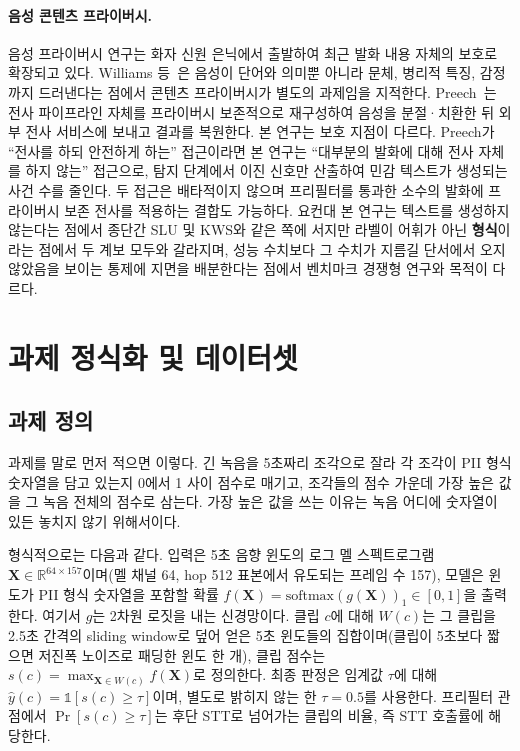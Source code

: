 \documentclass[10pt,twocolumn]{article}
\renewcommand{\emph}[1]{\textbf{#1}}
\begin{document}
\paragraph{음성 콘텐츠 프라이버시.}
음성 프라이버시 연구는 화자 신원 은닉에서 출발하여 최근 발화 내용 자체의 보호로 확장되고
있다. Williams 등~\cite{williams2022content}은 음성이 단어와 의미뿐 아니라 문체, 병리적 특징,
감정까지 드러낸다는 점에서 콘텐츠 프라이버시가 별도의 과제임을 지적한다.
Preech~\cite{ahmed2020preech}는 전사 파이프라인 자체를 프라이버시 보존적으로 재구성하여
음성을 분절·치환한 뒤 외부 전사 서비스에 보내고 결과를 복원한다. 본 연구는 보호 지점이
다르다. Preech가 ``전사를 하되 안전하게 하는'' 접근이라면 본 연구는 ``대부분의 발화에 대해
전사 자체를 하지 않는'' 접근으로, 탐지 단계에서 이진 신호만 산출하여 민감 텍스트가 생성되는
사건 수를 줄인다. 두 접근은 배타적이지 않으며 프리필터를 통과한 소수의 발화에 프라이버시
보존 전사를 적용하는 결합도 가능하다. 요컨대 본 연구는 텍스트를 생성하지 않는다는 점에서
종단간 SLU 및 KWS와 같은 쪽에 서지만 라벨이 어휘가 아닌 \emph{형식}이라는 점에서 두 계보
모두와 갈라지며, 성능 수치보다 그 수치가 지름길 단서에서 오지 않았음을 보이는 통제에 지면을
배분한다는 점에서 벤치마크 경쟁형 연구와 목적이 다르다.

\section{과제 정식화 및 데이터셋}\label{sec:data}

\subsection{과제 정의}
과제를 말로 먼저 적으면 이렇다. 긴 녹음을 5초짜리 조각으로 잘라 각 조각이 PII 형식 숫자열을
담고 있는지 0에서 1 사이 점수로 매기고, 조각들의 점수 가운데 가장 높은 값을 그 녹음 전체의
점수로 삼는다. 가장 높은 값을 쓰는 이유는 녹음 어디에 숫자열이 있든 놓치지 않기 위해서이다.

형식적으로는 다음과 같다. 입력은 5초 음향 윈도의 로그 멜 스펙트로그램
$\mathbf{X}\in\mathbb{R}^{64\times157}$이며(멜 채널 64, hop 512 표본에서 유도되는 프레임 수
157), 모델은 윈도가 PII 형식 숫자열을 포함할 확률
$f(\mathbf{X})=\mathrm{softmax}(g(\mathbf{X}))_1\in[0,1]$을 출력한다. 여기서 $g$는
2차원 로짓을 내는 신경망이다. 클립 $c$에 대해 $W(c)$는 그 클립을 2.5초 간격의 sliding
window로 덮어 얻은 5초 윈도들의 집합이며(클립이 5초보다 짧으면 저진폭 노이즈로 패딩한 윈도
한 개), 클립 점수는 $s(c)=\max_{\mathbf{X}\in W(c)} f(\mathbf{X})$로 정의한다. 최종 판정은
임계값 $\tau$에 대해 $\hat{y}(c)=\mathbb{1}[s(c)\ge\tau]$이며, 별도로 밝히지 않는 한
$\tau=0.5$를 사용한다. 프리필터 관점에서 $\Pr[s(c)\ge\tau]$는 후단 STT로 넘어가는 클립의
비율, 즉 STT 호출률에 해당한다.
\end{document}
